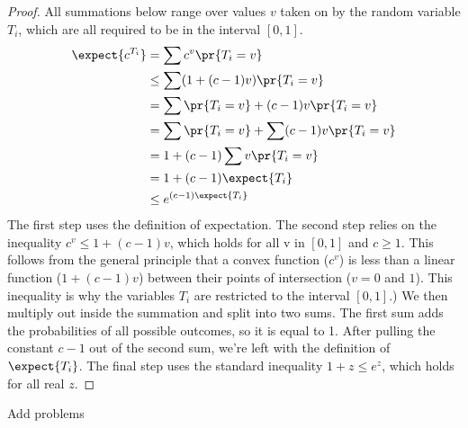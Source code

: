 \begin{proof}
All summations below range over values $v$ taken on by the random
variable $T_i$, which are all required to be in the interval $[0, 1]$.
\begin{align*}
\expect{c^{T_i}} & = \sum c^v \pr{T_i = v} \\
           & \leq \sum (1 + (c-1) v) \pr{T_i = v} \\
           & = \sum \pr{T_i = v} + (c-1) v \pr{T_i = v} \\
           & = \sum \pr{T_i = v} + \sum(c-1) v \pr{T_i = v} \\
           & = 1 + (c - 1) \sum v \pr{T_i = v} \\
           & = 1 + (c - 1) \expect{T_i} \\
           & \leq e^{(c - 1) \expect{T_i}}
\end{align*}
The first step uses the definition of expectation.  The second step
relies on the inequality $c^v \leq 1 + (c-1) v$, which holds for all v
in $[0,1]$ and $c \geq 1$.  This follows from the general principle that a
convex function ($c^v$) is less than a linear function ($1 + (c-1) v$)
between their points of intersection ($v = 0$ and $1$).  This
inequality is why the variables $T_i$ are restricted to the interval
$[0, 1]$.)  We then multiply out inside the summation and split into
two sums.  The first sum adds the probabilities of all possible
outcomes, so it is equal to 1.  After pulling the constant $c - 1$ out
of the second sum, we're left with the definition of $\expect{T_i}$.  The
final step uses the standard inequality $1 + z \leq e^z$, which holds
for all real $z$.
\end{proof}

\begin{editingnotes}
Add problems
\end{editingnotes}

\iffalse

\begin{problems}
\classproblems

\end{problems}
\fi

\endinput
